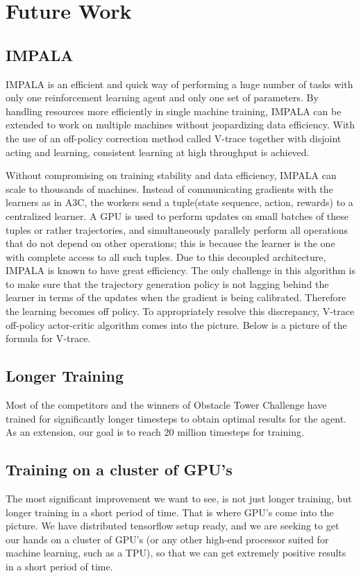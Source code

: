 \documentclass[conference]{IEEEtran}
\begin{document}
\section{Future Work}

\subsection{\textbf{IMPALA}}

IMPALA \cite{Espeholt-et-al} is an efficient and quick way of performing a huge number of tasks with only one reinforcement learning agent and only one set of parameters. By handling resources more efficiently in  single machine training, IMPALA can be extended to work on multiple machines without jeopardizing data efficiency. With the use of an off-policy correction method called V-trace together with disjoint acting and learning, consistent learning at high throughput is achieved.

Without compromising on training stability and data efficiency, IMPALA can scale to thousands of machines. Instead of communicating gradients with the learners as in A3C, the workers send a tuple(state sequence, action, rewards) to a centralized learner. A GPU is used to perform updates on small batches of these tuples or rather trajectories, and simultaneously parallely perform all operations that do not depend on other operations; this is because the learner is the one with complete access to all such tuples. Due to this decoupled architecture, IMPALA is known to have great efficiency. The only challenge in this algorithm is to make sure that the trajectory generation policy is not lagging behind the learner in terms of the updates when the gradient is being calibrated. Therefore the learning becomes off policy. To appropriately resolve this discrepancy,  V-trace off-policy actor-critic algorithm comes into the picture. Below is a picture of the formula for V-trace.

\subsection{\textbf{Longer Training}}
Most of the competitors and the winners of Obstacle Tower Challenge have trained for significantly longer timesteps to obtain optimal results for the agent. As an extension, our goal is to reach 20 million timesteps for training.

\subsection{\textbf{Training on a cluster of GPU's}}
The most significant improvement we want to see, is not just longer training, but longer training in a short period of time. That is where GPU's come into the picture. We have distributed tensorflow setup ready, and we are seeking to get our hands on a cluster of GPU's (or any other high-end processor suited for machine learning, such as a TPU), so that we can get extremely positive results in a short period of time.
\end{document}
